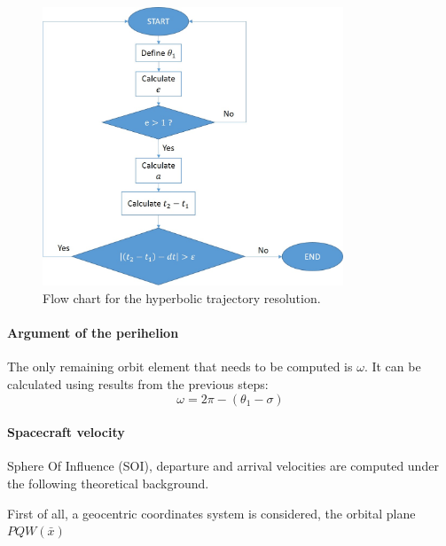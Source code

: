 \begin{itemize}
\begin{figure}[H]
\centering
\includegraphics[width=0.8\textwidth]{././images/flowcharthyp.jpg} 
\caption{Flow chart for the hyperbolic trajectory resolution.}
\label{Flowhyp}
\end{figure}
\end{itemize}
\paragraph{Argument of the perihelion} 
The only remaining orbit element that needs to be computed is $\omega$. It can be calculated using results from the previous steps:
\begin{equation}
\omega = 2\pi - (\theta _1 - \sigma )
\end{equation}

\paragraph{Spacecraft velocity}
Sphere Of Influence (SOI), departure and arrival velocities are computed under the following theoretical background.

First of all, a geocentric coordinates system is considered, the orbital plane \textit{$PQW(\bar{x})$}





